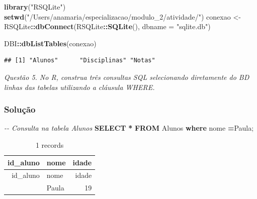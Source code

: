 \documentclass[
]{article}
\newenvironment{Shaded}{\begin{snugshade}}{\end{snugshade}}
\newcommand{\AttributeTok}[1]{\textcolor[rgb]{0.13,0.29,0.53}{#1}}
\newcommand{\CommentTok}[1]{\textcolor[rgb]{0.56,0.35,0.01}{\textit{#1}}}
\newcommand{\FunctionTok}[1]{\textcolor[rgb]{0.13,0.29,0.53}{\textbf{#1}}}
\newcommand{\KeywordTok}[1]{\textcolor[rgb]{0.13,0.29,0.53}{\textbf{#1}}}
\newcommand{\NormalTok}[1]{#1}
\newcommand{\OperatorTok}[1]{\textcolor[rgb]{0.81,0.36,0.00}{\textbf{#1}}}
\newcommand{\OtherTok}[1]{\textcolor[rgb]{0.56,0.35,0.01}{#1}}
\newcommand{\SpecialCharTok}[1]{\textcolor[rgb]{0.81,0.36,0.00}{\textbf{#1}}}
\newcommand{\StringTok}[1]{\textcolor[rgb]{0.31,0.60,0.02}{#1}}
\begin{document}
\begin{Shaded}
\begin{Highlighting}[]
\FunctionTok{library}\NormalTok{(}\StringTok{"RSQLite"}\NormalTok{)}
\FunctionTok{setwd}\NormalTok{(}\StringTok{"/Users/anamaria/especializacao/modulo\_2/atividade/"}\NormalTok{)}
\NormalTok{conexao }\OtherTok{\textless{}{-}}\NormalTok{ RSQLite}\SpecialCharTok{::}\FunctionTok{dbConnect}\NormalTok{(RSQLite}\SpecialCharTok{::}\FunctionTok{SQLite}\NormalTok{(), }\AttributeTok{dbname =} \StringTok{"sqlite.db"}\NormalTok{)}
\end{Highlighting}
\end{Shaded}

\begin{Shaded}
\begin{Highlighting}[]
\NormalTok{DBI}\SpecialCharTok{::}\FunctionTok{dbListTables}\NormalTok{(conexao)}
\end{Highlighting}
\end{Shaded}

\begin{verbatim}
## [1] "Alunos"      "Disciplinas" "Notas"
\end{verbatim}

\emph{Questão 5. No R, construa três consultas SQL selecionando
diretamente do BD linhas das tabelas utilizando a cláusula WHERE.}

\subsubsection{Solução}\label{soluuxe7uxe3o-4}

\begin{Shaded}
\begin{Highlighting}[]
\CommentTok{{-}{-} Consulta na tabela Alunos}
\KeywordTok{SELECT} \OperatorTok{*} \KeywordTok{FROM}\NormalTok{ Alunos }\KeywordTok{where}\NormalTok{ nome }\OperatorTok{=}\StringTok{\textquotesingle{}Paula\textquotesingle{}}\NormalTok{;}
\end{Highlighting}
\end{Shaded}

\begin{longtable}[]{@{}rlr@{}}
\caption{1 records}\tabularnewline
\toprule\noalign{}
id\_aluno & nome & idade \\
\midrule\noalign{}
\endfirsthead
\toprule\noalign{}
id\_aluno & nome & idade \\
\midrule\noalign{}
\endhead
\bottomrule\noalign{}
\endlastfoot
5 & Paula & 19 \\
\end{longtable}
\end{document}
